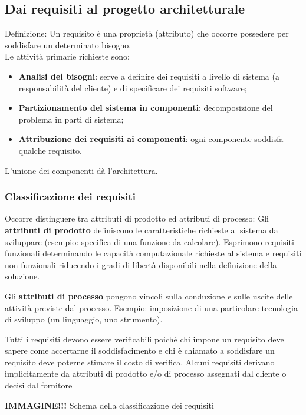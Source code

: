 \subsection{Dai requisiti al progetto architetturale}
Definizione: Un requisito è una proprietà (attributo) che occorre possedere per soddisfare un determinato bisogno.\\
Le attività primarie richieste sono:
\begin{itemize}
\item \textbf{Analisi dei bisogni}: serve a definire dei requisiti a livello di sistema (a responsabilità del cliente) e
di specificare dei requisiti software;
\item \textbf{Partizionamento del sistema in componenti}: decomposizione del problema in parti di sistema;
\item \textbf{Attribuzione dei requisiti ai componenti}: ogni componente soddisfa qualche requisito.
\end{itemize}
L'unione dei componenti dà l'architettura.

\subsubsection{Classificazione dei requisiti}
Occorre distinguere tra attributi di prodotto ed attributi di processo:
Gli \textbf{attributi di prodotto} definiscono le caratteristiche richieste al sistema da sviluppare (esempio: specifica di una funzione da calcolare). Esprimono requisiti funzionali determinando le capacità computazionale richieste al sistema e requisiti non funzionali riducendo i gradi di libertà disponibili nella definizione della soluzione.

Gli \textbf{attributi di processo} pongono vincoli sulla conduzione e sulle uscite delle attività previste dal processo.
Esempio: imposizione di una particolare tecnologia di sviluppo (un linguaggio, uno strumento).

Tutti i requisiti devono essere verificabili poiché chi impone un requisito deve sapere come accertarne il soddisfacimento e chi è chiamato a soddisfare un requisito deve poterne stimare il costo di verifica.
Alcuni requisiti derivano implicitamente da attributi di prodotto e/o di processo assegnati dal cliente o decisi dal fornitore

\begin{center}
\textbf{IMMAGINE!!!}
Schema della classificazione dei requisiti
\end{center}

